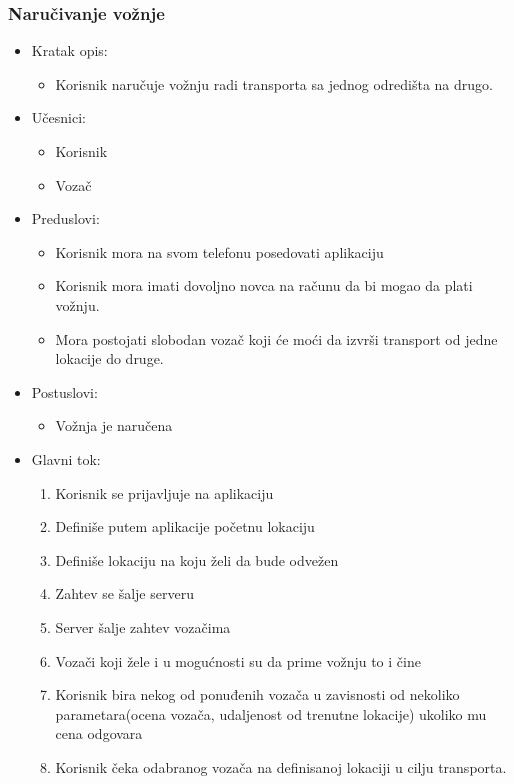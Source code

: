 \subsubsection{\bfseries Naru\v civanje vo\v znje}
\begin{itemize}
	\item Kratak opis:
		\begin{itemize}
			\item Korisnik naručuje vožnju radi transporta sa jednog odredišta na drugo.
		\end{itemize}
 
	\item Učesnici:
		\begin{itemize}
			\item Korisnik
		    \item Vozač
		\end{itemize}				

	\item Preduslovi:
		\begin{itemize}
		    \item Korisnik mora na svom telefonu posedovati aplikaciju
		    \item Korisnik mora imati dovoljno novca na računu da bi mogao da plati vožnju.
		    \item Mora postojati slobodan vozač koji će moći da izvrši transport od jedne lokacije do druge.
		\end{itemize}

	\item Postuslovi:
		\begin{itemize}
			\item Vožnja je naručena
		\end{itemize}		


	\item Glavni tok:
		\begin{enumerate}
		    \item Korisnik se prijavljuje na aplikaciju
		    \item Definiše putem  aplikacije  početnu lokaciju
		    \item Definiše lokaciju na koju želi da bude odvežen
		    \item Zahtev se šalje serveru
		    \item Server šalje zahtev vozačima
		    \item Vozači koji žele i u mogućnosti su da prime vožnju to i čine
		    \item Korisnik bira  nekog od ponuđenih vozača u zavisnosti od nekoliko parametara(ocena vozača, udaljenost od trenutne lokacije) ukoliko mu cena odgovara
		    \item Korisnik čeka odabranog vozača na definisanoj lokaciji u cilju transporta. 
		\end{enumerate}


\end{itemize}
